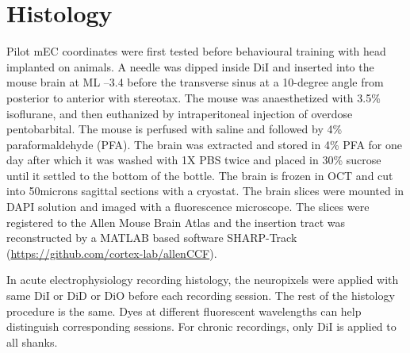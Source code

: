 \section{Histology}
Pilot mEC coordinates were first tested before behavioural training with head implanted on animals. A needle was dipped inside DiI and inserted into the mouse brain at ML –3.4 before the transverse sinus at a 10-degree angle from posterior to anterior with stereotax. The mouse was anaesthetized with 3.5\% isoflurane, and then euthanized by intraperitoneal injection of overdose pentobarbital. The mouse is perfused with saline and followed by 4\% paraformaldehyde (PFA). The brain was extracted and stored in 4\% PFA for one day after which it was washed with 1X PBS twice and placed in 30\% sucrose until it settled to the bottom of the bottle. The brain is frozen in OCT and cut into 50microns sagittal sections with a cryostat. The brain slices were mounted in DAPI solution and imaged with a fluorescence microscope. The slices were registered to the Allen Mouse Brain Atlas and the insertion tract was reconstructed by a MATLAB based software SHARP-Track (\href{https://github.com/cortex-lab/allenCCF}{https://github.com/cortex-lab/allenCCF}).

 In acute electrophysiology recording histology, the neuropixels were applied with same DiI or DiD or DiO before each recording session. The rest of the histology procedure is the same. Dyes at different fluorescent wavelengths can help distinguish corresponding sessions. For chronic recordings, only DiI is applied to all shanks.
